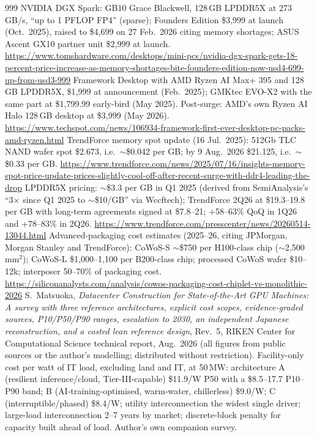\begin{thebibliography}{999}
 NVIDIA DGX Spark: GB10 Grace Blackwell, 128\,GB LPDDR5X at 273\,GB/s, ``up to 1 PFLOP FP4'' (sparse); Founders Edition \$3,999 at launch (Oct.\ 2025), raised to \$4,699 on 27 Feb.\ 2026 citing memory shortages; ASUS Ascent GX10 partner unit \$2,999 at launch. \url{https://www.tomshardware.com/desktops/mini-pcs/nvidia-dgx-spark-gets-18-percent-price-increase-as-memory-shortages-bite-founders-edition-now-usd4-699-up-from-usd3-999}
 Framework Desktop with AMD Ryzen AI Max+ 395 and 128\,GB LPDDR5X, \$1,999 at announcement (Feb.\ 2025); GMKtec EVO-X2 with the same part at \$1,799.99 early-bird (May 2025). Post-surge: AMD's own Ryzen AI Halo 128\,GB desktop at \$3,999 (May 2026). \url{https://www.techspot.com/news/106934-framework-first-ever-desktop-pc-packs-amd-ryzen.html}
 TrendForce memory spot update (16 Jul.\ 2025): 512Gb TLC NAND wafer spot \$2.673, i.e.\ $\sim$\$0.042 per GB; by 9 Aug.\ 2026 \$21.125, i.e.\ $\sim$\$0.33 per GB. \url{https://www.trendforce.com/news/2025/07/16/insights-memory-spot-price-update-prices-slightly-cool-off-after-recent-surge-with-ddr4-leading-the-drop}
 LPDDR5X pricing: $\sim$\$3.3 per GB in Q1 2025 (derived from SemiAnalysis's ``3$\times$ since Q1 2025 to $\sim$\$10/GB'' via Wccftech); TrendForce 2Q26 at \$19.3--19.8 per GB with long-term agreements signed at \$7.8--21; +58--63\% QoQ in 1Q26 and +78--83\% in 2Q26. \url{https://www.trendforce.com/presscenter/news/20260514-13044.html}
 Advanced-packaging cost estimates (2025--26, citing JPMorgan, Morgan Stanley and TrendForce): CoWoS-S $\sim$\$750 per H100-class chip ($\sim$2,500\,mm$^2$); CoWoS-L \$1,000--1,100 per B200-class chip; processed CoWoS wafer \$10--12k; interposer 50--70\% of packaging cost. \url{https://siliconanalysts.com/analysis/cowos-packaging-cost-chiplet-vs-monolithic-2026}
 S.~Matsuoka, \emph{Datacenter Construction for State-of-the-Art GPU Machines: A survey with three reference architectures, explicit cost scopes, evidence-graded sources, P10/P50/P90 ranges, escalation to 2030, an independent Japanese reconstruction, and a costed lean reference design}, Rev.\ 5, RIKEN Center for Computational Science technical report, Aug.\ 2026 (all figures from public sources or the author's modelling; distributed without restriction). Facility-only cost per watt of IT load, excluding land and IT, at 50\,MW: architecture A (resilient inference/cloud, Tier-III-capable) \$11.9/W P50 with a \$8.5--17.7 P10--P90 band; B (AI-training-optimised, warm-water, chillerless) \$9.0/W; C (interruptible/phased) \$8.4/W; utility interconnection the widest single driver; large-load interconnection 2--7 years by market; discrete-block penalty for capacity built ahead of load. Author's own companion survey.

\end{thebibliography}
